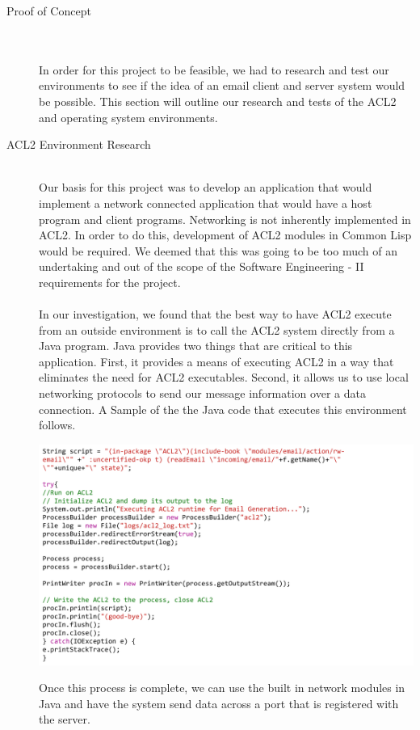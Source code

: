 \documentclass[11pt, letterpaper]{report}
\begin{document}
\begin{description}
\newpage 
\item[\Large Proof of Concept] \hfill \\ \hfill \\
In order for this project to be feasible, we had to research and test our environments to see if the idea of an email client and server system would be possible. This section will outline our research and tests of the ACL2 and operating system environments. 
\item[ACL2 Environment Research] \hfill \\
Our basis for this project was to develop an application that would implement a network connected application that would have a host program and client programs. Networking is not inherently implemented in ACL2. In order to do this, development of ACL2 modules in Common Lisp would be required. We deemed that this was going to be too much of an undertaking and out of the scope of the Software Engineering - II requirements for the project. \\ \\
In our investigation, we found that the best way to have ACL2 execute from an outside environment is to call the ACL2 system directly from a Java program. Java provides two things that are critical to this application. First, it provides a means of executing ACL2 in a way that eliminates the need for ACL2 executables. Second, it allows us to use local networking protocols to send our message information over a data connection. A Sample of the the Java code that executes this environment follows.

\includegraphics[scale=.8]{javaproc}

Once this process is complete, we can use the built in network modules in Java and have the system send data across a port that is registered with the server.



\end{description}
\end{document}
